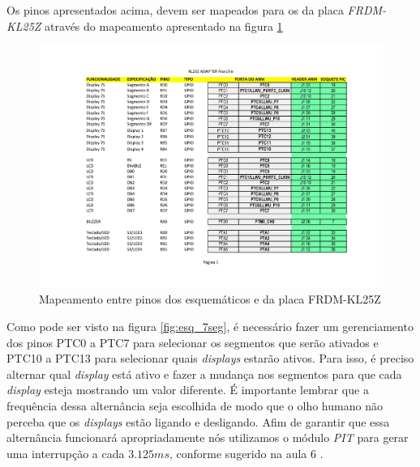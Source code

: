 \documentclass{article}
\begin{document}
Os pinos apresentados acima, devem ser mapeados para os da placa \textit{FRDM-KL25Z} através do mapeamento apresentado na figura \ref{fig:pinout}
\begin{figure}[H]
	\centering
	\includegraphics[width=0.9\linewidth]{Pinout}
	\caption{Mapeamento entre pinos dos esquemáticos e da placa FRDM-KL25Z}
	\label{fig:pinout}
\end{figure}

Como pode ser visto na figura \ref{fig:esq_7seg}, é necessário fazer um gerenciamento dos pinos PTC0 a PTC7 para selecionar os segmentos que serão ativados e PTC10 a PTC13 para selecionar quais \textit{displays} estarão ativos. Para isso, é preciso alternar qual \textit{display} está ativo e fazer a mudança nos segmentos para que cada \textit{display} esteja mostrando um valor diferente. É importante lembrar que a frequência dessa alternância seja escolhida de modo que o olho humano não perceba que os \textit{displays} estão ligando e desligando. Afim de garantir que essa alternância funcionará apropriadamente nós utilizamos o módulo \textit{PIT} para gerar uma interrupção a cada $3.125 ms$, conforme sugerido na aula 6 \cite{bb:aula6}. 
\end{document}
